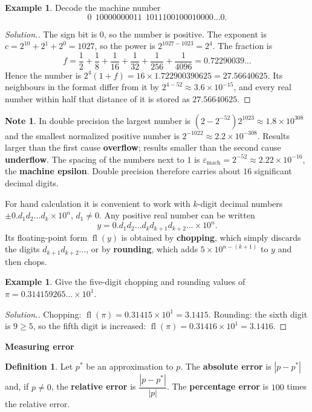 \documentclass[11pt,a4paper]{article}
\numberwithin{equation}{section}
\DeclareMathOperator{\fl}{fl}
\theoremstyle{definition}
\newtheorem{defn}[thm]{Definition}
\newtheorem{exa}[thm]{Example}
\newtheorem*{note}{Note}
\newenvironment{solution}
  {\renewcommand{\qedsymbol}{}\begin{proof}[\textit{Solution}.]}
  {\end{proof}}
\newcommand{\subhead}[1]{%
  \par\medskip\noindent\textbf{#1}\par\nobreak\smallskip}
\begin{document}
\begin{exa}
Decode the machine number
$$0\ \ 10000000011\ \ 1011100100010000\ldots0 .$$
\end{exa}

\begin{solution}
The sign bit is $0$, so the number is positive. The exponent is $c = 2^{10}+2^1+2^0 = 1027$, so the power is $2^{1027-1023} = 2^4$. The
fraction is
$$f = \frac12+\frac18+\frac1{16}+\frac1{32}+\frac1{256}+\frac1{4096} = 0.72290039\ldots$$
Hence the number is $2^4(1+f) = 16\times1.722900390625 = 27.56640625$. Its neighbours in the format differ from it by $2^{4-52}\approx
3.6\times10^{-15}$, and every real number within half that distance of it is stored as $27.56640625$.
\end{solution}

\begin{note}
In double precision the largest number is $(2-2^{-52})2^{1023}\approx1.8\times10^{308}$ and the smallest normalized positive number is
$2^{-1022}\approx2.2\times10^{-308}$. Results larger than the first cause \textbf{overflow}; results smaller than the second cause
\textbf{underflow}. The spacing of the numbers next to $1$ is $\varepsilon_{\text{mach}} = 2^{-52}\approx2.22\times10^{-16}$, the
\textbf{machine epsilon}. Double precision therefore carries about $16$ significant decimal digits.
\end{note}

For hand calculation it is convenient to work with $k$-digit decimal numbers $\pm0.d_1d_2\ldots d_k\times10^n$, $d_1\neq0$. Any positive
real number can be written
$$y = 0.d_1d_2\ldots d_kd_{k+1}d_{k+2}\ldots\times10^n .$$
Its floating-point form $\fl(y)$ is obtained by \textbf{chopping}, which simply discards the digits $d_{k+1}d_{k+2}\ldots$, or by
\textbf{rounding}, which adds $5\times10^{n-(k+1)}$ to $y$ and then chops.

\begin{exa}
Give the five-digit chopping and rounding values of $\pi = 0.314159265\ldots\times10^1$.
\end{exa}

\begin{solution}
Chopping: $\fl(\pi) = 0.31415\times10^1 = 3.1415$. Rounding: the sixth digit is $9\geq5$, so the fifth digit is increased:
$\fl(\pi) = 0.31416\times10^1 = 3.1416$.
\end{solution}

\subhead{Measuring error}

\begin{defn}
Let $p^*$ be an approximation to $p$. The \textbf{absolute error} is $|p - p^*|$ and, if $p\neq0$, the \textbf{relative error} is
$\dfrac{|p-p^*|}{|p|}$. The \textbf{percentage error} is $100$ times the relative error.
\end{defn}
\end{document}
